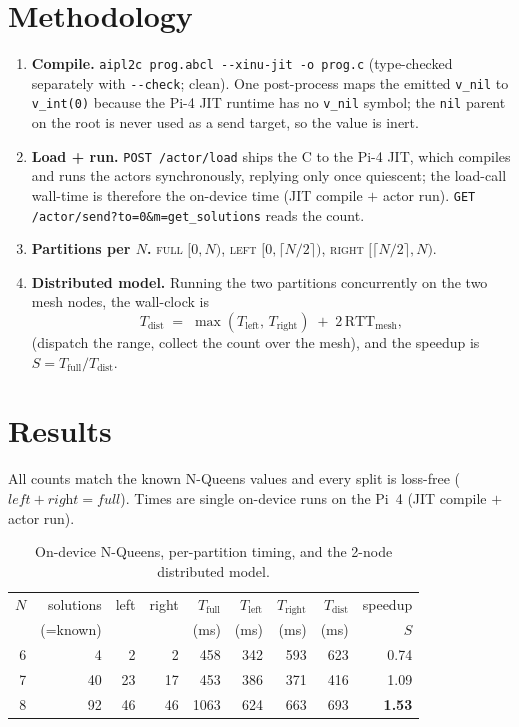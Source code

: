 \documentclass[11pt]{article}
\begin{document}
\section{Methodology}
\begin{enumerate}
  \item \textbf{Compile.} \texttt{aipl2c prog.abcl -{}-xinu-jit -o prog.c}
  (type-checked separately with \texttt{-{}-check}; clean). One post-process maps
  the emitted \texttt{v\_nil} to \texttt{v\_int(0)} because the Pi-4 JIT runtime
  has no \texttt{v\_nil} symbol; the \texttt{nil} parent on the root is never used
  as a send target, so the value is inert.
  \item \textbf{Load + run.} \texttt{POST /actor/load} ships the C to the Pi-4 JIT,
  which compiles and runs the actors synchronously, replying only once quiescent;
  the load-call wall-time is therefore the on-device time (JIT compile $+$ actor
  run). \texttt{GET /actor/send?to=0\&m=get\_solutions} reads the count.
  \item \textbf{Partitions per $N$.} \textsc{full} $[0,N)$, \textsc{left}
  $[0,\lceil N/2\rceil)$, \textsc{right} $[\lceil N/2\rceil,N)$.
  \item \textbf{Distributed model.} Running the two partitions concurrently on the
  two mesh nodes, the wall-clock is
  \[
    T_\mathrm{dist} \;=\; \max(T_\mathrm{left},\,T_\mathrm{right}) \;+\; 2\,\mathrm{RTT_{mesh}},
  \]
  (dispatch the range, collect the count over the mesh), and the speedup is
  $S = T_\mathrm{full}/T_\mathrm{dist}$.
\end{enumerate}

\section{Results}
All counts match the known N-Queens values and every split is loss-free
($\textit{left}+\textit{right}=\textit{full}$). Times are single on-device runs
on the Pi~4 (JIT compile $+$ actor run).

\begin{table}[h]\centering
\caption{On-device N-Queens, per-partition timing, and the 2-node distributed model.}
\label{tab:res}
\begin{tabular}{rrrr rrr rr}
\toprule
$N$ & solutions & left & right & $T_\mathrm{full}$ & $T_\mathrm{left}$ & $T_\mathrm{right}$ & $T_\mathrm{dist}$ & speedup\\
 & (=known) & & & (ms) & (ms) & (ms) & (ms) & $S$\\
\midrule
6 & 4  & 2  & 2  & 458  & 342 & 593 & 623 & 0.74\\
7 & 40 & 23 & 17 & 453  & 386 & 371 & 416 & 1.09\\
8 & 92 & 46 & 46 & 1063 & 624 & 663 & 693 & \textbf{1.53}\\
\bottomrule
\end{tabular}
\end{table}
\end{document}
